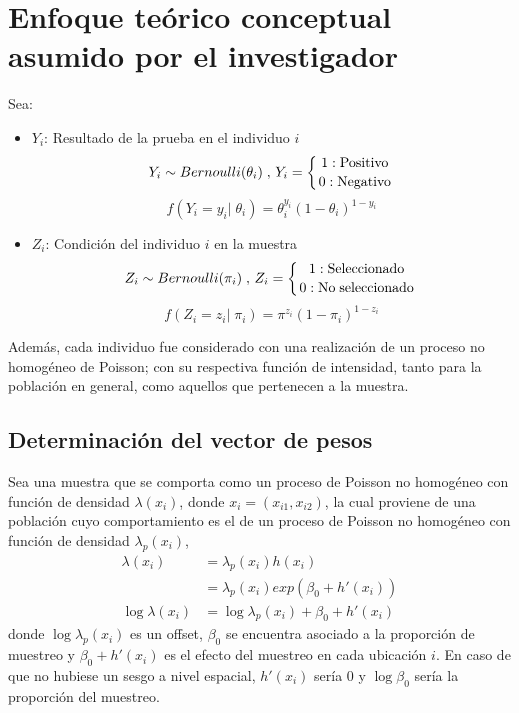 \section{Enfoque teórico conceptual asumido por el investigador}\label{enfteocon}
Sea:
\begin{itemize}
    \item[] $Y_i$: Resultado de la prueba en el individuo $i$\\
    $$Y_i \sim Bernoulli(\theta_i) \; , \,Y_i = \left\{ 1: \mathrm{Positivo}\atop 0: \mathrm{Negativo} \right. $$
    $$f(Y_i=y_i|\;\theta_i) = \theta_i^{y_i} (1-\theta_i)^{1-y_i}$$
    \item[] $Z_i$: Condición del individuo $i$ en la muestra\\
    $$Z_i \sim Bernoulli(\pi_i) \; , \, Z_i = \left\{ 1: \mathrm{Seleccionado} \atop 0: \mathrm{No \; seleccionado} \right.$$
    $$f(Z_i=z_i|\;\pi_i) = \pi^{z_i} (1-\pi_i)^{1-z_i}$$
\end{itemize}
Además, cada individuo fue considerado con una realización de un proceso no homogéneo de Poisson; con su respectiva función de intensidad, tanto para la población en general, como aquellos que pertenecen a la muestra.





\subsection{Determinación del vector de pesos}
Sea una muestra que se comporta como un proceso de Poisson no homogéneo con función de densidad $\lambda(x_i)$, donde $x_i = (x_{i1},x_{i2})$, la cual proviene de una población cuyo comportamiento es el de un proceso de Poisson no homogéneo con función de densidad $\lambda_p(x_i)$,
\begin{align*}
	\lambda(x_i) &= \lambda_p(x_i) h(x_i)\\
	&= \lambda_p(x_i) exp \left(\beta_0 + h'(x_i)\right)\\
	\log \lambda(x_i) &= \log \lambda_p(x_i) + \beta_0 + h'(x_i)
\end{align*}
donde $\log \lambda_p(x_i)$ es un offset, $\beta_0$ se encuentra asociado a la proporción de muestreo y $\beta_0 + h'(x_i)$ es el efecto del muestreo en cada ubicación $i$. En caso de que no hubiese un sesgo a nivel espacial, $h'(x_i)$ sería 0 y $\log \beta_0$ sería la proporción del muestreo.

